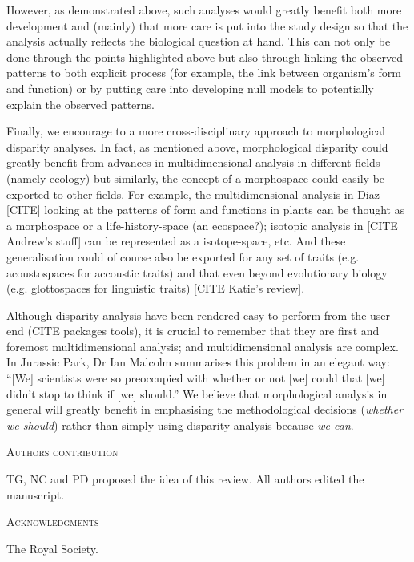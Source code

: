 \documentclass[12pt,letterpaper]{article}
\renewcommand{\section}[1]{%
\bigskip
\begin{center}
\begin{Large}
\normalfont\scshape #1
\medskip
\end{Large}
\end{center}}
\begin{document}
However, as demonstrated above, such analyses would greatly benefit both more development and (mainly) that more care is put into the study design so that the analysis actually reflects the biological question at hand.
This can not only be done through the points highlighted above but also through linking the observed patterns to both explicit process (for example, the link between organism's form and function) or by putting care into developing null models to potentially explain the observed patterns.

Finally, we encourage to a more cross-disciplinary approach to morphological disparity analyses.
In fact, as mentioned above, morphological disparity could greatly benefit from advances in multidimensional analysis in different fields (namely ecology) but similarly, the concept of a morphospace could easily be exported to other fields.
For example, the multidimensional analysis in Diaz [CITE] looking at the patterns of form and functions in plants can be thought as a morphospace or a life-history-space (an ecospace?);
isotopic analysis in [CITE Andrew's stuff] can be represented as a isotope-space, etc.
And these generalisation could of course also be exported for any set of traits (e.g. acoustospaces for accoustic traits) and that even beyond evolutionary biology (e.g. glottospaces for linguistic traits) [CITE Katie's review].

Although disparity analysis have been rendered easy to perform from the user end (CITE packages tools), it is crucial to remember that they are first and foremost multidimensional analysis; and multidimensional analysis are complex.
In Jurassic Park, Dr Ian Malcolm summarises this problem in an elegant way: ``[We] scientists were so preoccupied with whether or not [we] could that [we] didn't stop to think if [we] should.''
We believe that morphological analysis in general will greatly benefit in emphasising the methodological decisions (\textit{whether we should}) rather than simply using disparity analysis because \textit{we can}.



\section{Authors contribution}
TG, NC and PD proposed the idea of this review. All authors edited the manuscript.

\section{Acknowledgments}
The Royal Society.



\end{document}
